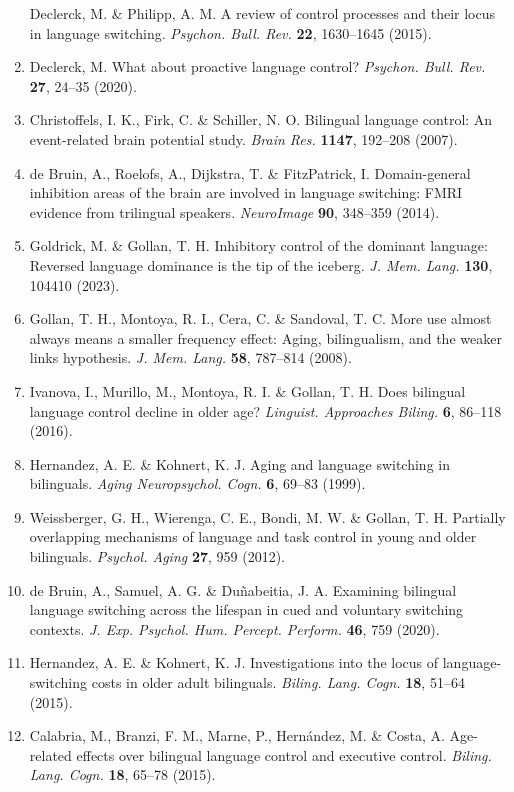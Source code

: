 \documentclass[
]{article}
\begin{document}
\begin{enumerate}
  Declerck, M. \& Philipp, A. M. A review of control processes and their locus in language switching. \emph{Psychon. Bull. Rev.} \textbf{22}, 1630--1645 (2015).
\item
  Declerck, M. What about proactive language control? \emph{Psychon. Bull. Rev.} \textbf{27}, 24--35 (2020).
\item
  Christoffels, I. K., Firk, C. \& Schiller, N. O. Bilingual language control: An event-related brain potential study. \emph{Brain Res.} \textbf{1147}, 192--208 (2007).
\item
  de Bruin, A., Roelofs, A., Dijkstra, T. \& FitzPatrick, I. Domain-general inhibition areas of the brain are involved in language switching: FMRI evidence from trilingual speakers. \emph{NeuroImage} \textbf{90}, 348--359 (2014).
\item
  Goldrick, M. \& Gollan, T. H. Inhibitory control of the dominant language: Reversed language dominance is the tip of the iceberg. \emph{J. Mem. Lang.} \textbf{130}, 104410 (2023).
\item
  Gollan, T. H., Montoya, R. I., Cera, C. \& Sandoval, T. C. More use almost always means a smaller frequency effect: Aging, bilingualism, and the weaker links hypothesis. \emph{J. Mem. Lang.} \textbf{58}, 787--814 (2008).
\item
  Ivanova, I., Murillo, M., Montoya, R. I. \& Gollan, T. H. Does bilingual language control decline in older age? \emph{Linguist. Approaches Biling.} \textbf{6}, 86--118 (2016).
\item
  Hernandez, A. E. \& Kohnert, K. J. Aging and language switching in bilinguals. \emph{Aging Neuropsychol. Cogn.} \textbf{6}, 69--83 (1999).
\item
  Weissberger, G. H., Wierenga, C. E., Bondi, M. W. \& Gollan, T. H. Partially overlapping mechanisms of language and task control in young and older bilinguals. \emph{Psychol. Aging} \textbf{27}, 959 (2012).
\item
  de Bruin, A., Samuel, A. G. \& Duñabeitia, J. A. Examining bilingual language switching across the lifespan in cued and voluntary switching contexts. \emph{J. Exp. Psychol. Hum. Percept. Perform.} \textbf{46}, 759 (2020).
\item
  Hernandez, A. E. \& Kohnert, K. J. Investigations into the locus of language-switching costs in older adult bilinguals. \emph{Biling. Lang. Cogn.} \textbf{18}, 51--64 (2015).
\item
  Calabria, M., Branzi, F. M., Marne, P., Hernández, M. \& Costa, A. Age-related effects over bilingual language control and executive control. \emph{Biling. Lang. Cogn.} \textbf{18}, 65--78 (2015).

\end{enumerate}
\end{document}
